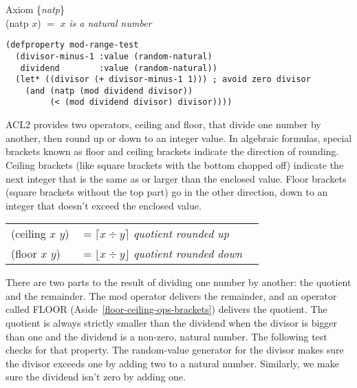 \label{natp-axiom-formal}
\begin{center}
Axiom \{\emph{natp}\} \\
(natp $x$) $=$ $x$ \emph{is a natural number}
\end{center}

\begin{Verbatim}
(defproperty mod-range-test
  (divisor-minus-1 :value (random-natural)
   dividend        :value (random-natural))
  (let* ((divisor (+ divisor-minus-1 1))) ; avoid zero divisor
    (and (natp (mod dividend divisor))
         (< (mod dividend divisor) divisor))))
\end{Verbatim}

\begin{aside}
ACL2 provides two operators,
ceiling and floor, that divide one number by another,
then round up or down to an integer value.
In algebraic formulas, special brackets known as
floor and ceiling brackets indicate the direction of rounding.
Ceiling brackets (like square brackets with the bottom chopped off)
indicate the next integer that is the same as or larger than
the enclosed value.
Floor brackets (square brackets without the top part)
go in the other direction, down to an integer
that doesn't exceed the enclosed value.

\begin{center}
\begin{tabular}{lll}
(ceiling $x$ $y$)& $= \lceil x  \div y \rceil $ \emph{quotient rounded up}   \\
(floor $x$ $y$)  & $= \lfloor x \div y \rfloor$ \emph{quotient rounded down} \\
\end{tabular}
\end{center}

\caption{Floor and Ceiling Operators, Floor and Ceiling Brackets}
\label{floor-def}
\label{ceiling-def}
\label{floor-ceiling-ops-brackets}
\end{aside}

There are two parts to the result
of dividing one number by another: the quotient and the remainder.
The mod operator delivers the remainder,
and an operator called FLOOR (Aside~\ref{floor-ceiling-ops-brackets})
delivers the quotient.
The quotient is always strictly smaller
than the dividend when the divisor is bigger than one
and the dividend is a non-zero, natural number.
The following test checks for that property.
The random-value generator for the divisor
makes sure the divisor exceeds one by adding two
to a natural number.
Similarly, we make sure the dividend isn't zero by adding one.

